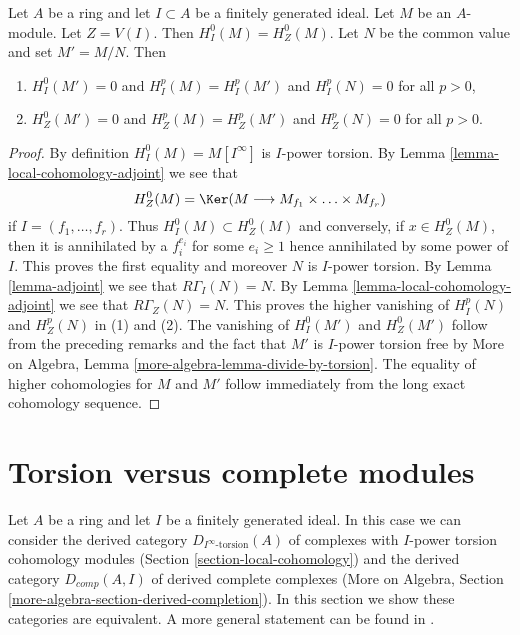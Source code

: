 \begin{lemma}
\label{lemma-divide-by-torsion}
Let $A$ be a ring and let $I \subset A$ be a finitely generated ideal.
Let $M$ be an $A$-module. Let $Z = V(I)$.
Then $H^0_I(M) = H^0_Z(M)$. Let $N$ be the common value and
set $M' = M/N$. Then
\begin{enumerate}
\item $H^0_I(M') = 0$ and $H^p_I(M) = H^p_I(M')$ and $H^p_I(N) = 0$
for all $p > 0$,
\item $H^0_Z(M') = 0$ and $H^p_Z(M) = H^p_Z(M')$ and $H^p_Z(N) = 0$
for all $p > 0$.
\end{enumerate}
\end{lemma}

\begin{proof}
By definition $H^0_I(M) = M[I^\infty]$ is $I$-power torsion.
By Lemma \ref{lemma-local-cohomology-adjoint} we see that
$$
H^0_Z(M) = \Ker(M \longrightarrow M_{f_1} \times \ldots \times M_{f_r})
$$
if $I = (f_1, \ldots, f_r)$. Thus $H^0_I(M) \subset H^0_Z(M)$ and
conversely, if $x \in H^0_Z(M)$, then it is annihilated by a $f_i^{e_i}$
for some $e_i \geq 1$ hence annihilated by some power of $I$.
This proves the first equality and moreover $N$ is $I$-power torsion.
By Lemma \ref{lemma-adjoint} we see that $R\Gamma_I(N) = N$.
By Lemma \ref{lemma-local-cohomology-adjoint} we see that $R\Gamma_Z(N) = N$.
This proves the higher vanishing of $H^p_I(N)$ and $H^p_Z(N)$ in (1) and (2).
The vanishing of $H^0_I(M')$ and $H^0_Z(M')$ follow from the preceding
remarks and the fact that $M'$ is $I$-power torsion free by
More on Algebra, Lemma \ref{more-algebra-lemma-divide-by-torsion}.
The equality of higher cohomologies for $M$ and $M'$ follow
immediately from the long exact cohomology sequence.
\end{proof}









\section{Torsion versus complete modules}
\label{section-torsion-and-complete}

\noindent
Let $A$ be a ring and let $I$ be a finitely generated ideal.
In this case we can consider the derived category
$D_{I^\infty\text{-torsion}}(A)$ of complexes
with $I$-power torsion cohomology modules
(Section \ref{section-local-cohomology})
and the derived category
$D_{comp}(A, I)$ of derived complete complexes
(More on Algebra, Section \ref{more-algebra-section-derived-completion}).
In this section we show these categories are equivalent.
A more general statement can be found in
\cite{Dwyer-Greenlees}.

